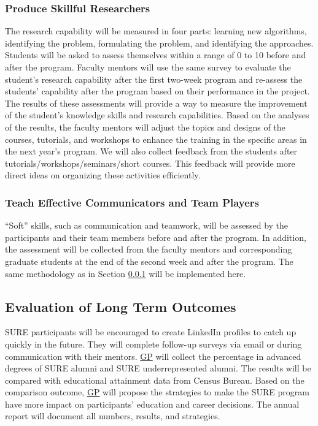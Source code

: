 \documentclass[11pt]{NSFamsart}
\newcommand{\GP}{\hyperlink{GPlink}{GP}\xspace}
\begin{document}
\subsubsection{Produce Skillful Researchers} \label{sec:hardskill}
The research capability will be measured in four parts: learning new algorithms, identifying the problem, formulating the problem, and identifying the approaches.
Students will be asked to assess themselves within a range of 0 to 10 before and after the program. Faculty mentors will use the same survey to evaluate the student's research capability after the first two-week program and re-assess the students’ capability after the program based on their performance in the project.
The results of these assessments will provide a way to measure the improvement of the student's knowledge skills and research capabilities. Based on the analyses of the results, the faculty mentors will adjust the topics and designs of the courses, tutorials,  and workshops to enhance the training in the specific areas in the next year's program.
We will also collect feedback from the students after tutorials/workshops/seminars/short courses. This feedback will provide more direct ideas on organizing these activities efficiently.

\subsubsection{Teach Effective Communicators and Team Players}

``Soft'' skills, such as communication and teamwork, will be assessed by the participants and their team members before and after the program. In addition, the assessment will be collected from the faculty mentors and corresponding graduate students at the end of the second week and after the program. The same methodology as in Section \ref{sec:hardskill} will be implemented here. 




\subsection{Evaluation of Long Term Outcomes}

SURE participants will be encouraged to create LinkedIn profiles to catch up quickly in the future. They will complete follow-up surveys via email or during communication with their mentors. \GP will collect the percentage in advanced degrees of SURE alumni and SURE underrepresented alumni. The results will be compared with educational attainment data from Census Bureau. Based on the comparison outcome, \GP will propose the strategies to make the SURE program have more impact on participants’ education and career decisions. The annual report will document all numbers, results, and strategies.
\end{document}
